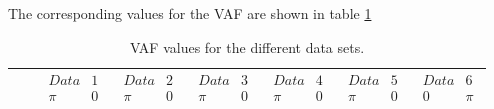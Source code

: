 \documentclass[main.tex]{subfiles}
\begin{document}
The corresponding values for the VAF are shown in table \ref{tab:VAF_1}
\begin{table}[h]
\centering
\caption{VAF values for the different data sets.}
\label{tab:VAF_1}
\begin{tabular}{|l|l|l|l|l|l|l|l|}
\hline
                &                                                  & $\begin{matrix}Data  & 1 \\\pi & 0 \end{matrix}$                                       & $\begin{matrix}Data & 2 \\\pi & 0 \\ \end{matrix}$                                      & $\begin{matrix}Data & 3 \\\pi & 0 \\ \end{matrix}$                                      & $\begin{matrix}Data & 4 \\\pi & 0 \\ \end{matrix}$                                     & $\begin{matrix}Data & 5\\\pi & 0 \\ \end{matrix}$                                       & $\begin{matrix}Data &6\\0 & \pi \\ \end{matrix}$                                      \\ \hline

\end{tabular}
\end{table}
\end{document}
